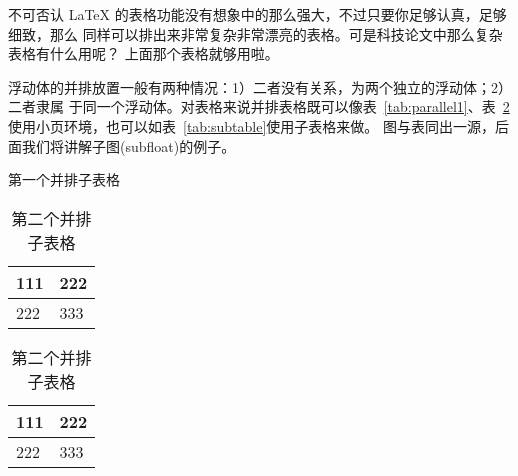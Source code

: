 不可否认 \LaTeX{} 的表格功能没有想象中的那么强大，不过只要你足够认真，足够细致，那么
同样可以排出来非常复杂非常漂亮的表格。可是科技论文中那么复杂表格有什么用呢？
上面那个表格就够用啦。

浮动体的并排放置一般有两种情况：1）二者没有关系，为两个独立的浮动体；2）二者隶属
于同一个浮动体。对表格来说并排表格既可以像表~\ref{tab:parallel1}、表~\ref{tab:parallel2} 
使用小页环境，也可以如表~\ref{tab:subtable}使用子表格来做。
图与表同出一源，后面我们将讲解子图(subfloat)的例子。
\begin{table}[htb]
\centering
\noindent\begin{minipage}{0.45\textwidth}
\centering
\caption{第一个并排子表格}
\label{tab:parallel1}
\begin{tabular}{p{2cm}p{2cm}}
\toprule[1.5pt]
111 & 222 \\\midrule[1pt]
222 & 333 \\\bottomrule[1.5pt]
\end{tabular}
\end{minipage}
\begin{minipage}{0.45\textwidth}
\centering
\caption{第二个并排子表格}
\label{tab:parallel2}
\begin{tabular}{p{2cm}p{2cm}}
\toprule[1.5pt]
111 & 222 \\\midrule[1pt]
222 & 333 \\\bottomrule[1.5pt]
\end{tabular}
\end{minipage}
\end{table}
\begin{table}[htbp]
\centering
\caption{并排子表格}
\label{tab:subtable}
\hskip2cm
\end{table}


